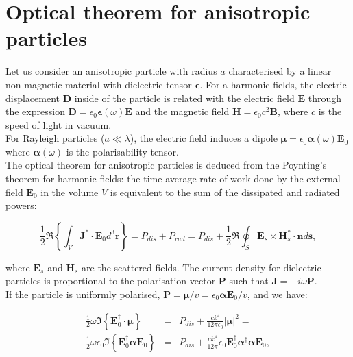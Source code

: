 \chapter{Optical theorem for anisotropic particles}

Let us consider an anisotropic particle with radius $a$ characterised by a linear non-magnetic material with dielectric tensor $\mathbf{\epsilon}$.
For a harmonic fields, the electric displacement $\mathbf{D}$ inside of the particle is related with the electric field $\mathbf{E}$ through the expression $\mathbf{D}=\epsilon_{0}\boldsymbol{\epsilon}\left(\omega\right)\mathbf{E}$ and the magnetic field $\mathbf{H}=\epsilon_{0}c^2\mathbf{B}$, where $c$ is the speed of light in vacuum.\\
For Rayleigh particles ($a\ll \lambda$), the electric field induces a dipole  $\boldsymbol{\mu}=\epsilon_{0}\boldsymbol{\alpha}\left(\omega\right)\mathbf{E}_{0}$ where $\boldsymbol{\alpha}\left(\omega\right)$ is the polarisability tensor.\\
The optical theorem for anisotropic particles is deduced from the Poynting's theorem for harmonic fields: the time-average rate of work done by the external field $\mathbf{E}_{0}$ in the volume $V$ is equivalent to the sum of the dissipated and radiated powers:

\begin{equation}
\frac{1}{2}\Re\left\{\int_{V}\mathbf{J}^{*}\cdot\mathbf{E}_{0}d^3\mathbf{r}\right\}=P_{dis}+P_{rad} = P_{dis} + \frac{1}{2}\Re{\oint_{S} \mathbf{E}_{s}\times \mathbf{H}_{s}^{*}\cdot \mathbf{n}d\mathbf{s}},
\end{equation}

where $\mathbf{E}_{s}$ and $\mathbf{H}_{s}$ are the scattered fields.
The current density for dielectric particles is proportional to the polarisation vector $\mathbf{P}$ such that $\mathbf{J}=-i\omega\mathbf{P}$.\\
If the particle is uniformly polarised, $\mathbf{P}=\boldsymbol{\mu}/v=\epsilon_{0}\boldsymbol{\alpha}\mathbf{E}_{0}/v$, and we have:

\begin{eqnarray}
\frac{1}{2}\omega \Im\left\{\mathbf{E}_{0}^{\dagger}\cdot\boldsymbol{\mu}\right\}& = & P_{dis} + \frac{ck^4}{12\pi\epsilon_{0}}\left|\boldsymbol{\mu}\right|^2 = \\
\frac{1}{2}\omega \epsilon_{0} \Im\left\{\mathbf{E}_{0}^{\dagger}\boldsymbol{\alpha}\mathbf{E}_{0}\right\}& = & P_{dis} + \frac{ck^4}{12\pi}\epsilon_{0}\mathbf{E}_{0}^{\dagger}\boldsymbol{\alpha}^{\dagger}\boldsymbol{\alpha}\mathbf{E}_{0},
\end{eqnarray}

